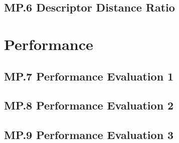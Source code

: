 \documentclass[a4paper]{scrartcl}
\begin{document}
\subsection*{MP.6 Descriptor Distance Ratio}

\section*{Performance}
\subsection*{MP.7 Performance Evaluation 1}
\subsection*{MP.8 Performance Evaluation 2}
\subsection*{MP.9 Performance Evaluation 3}
\end{document}
